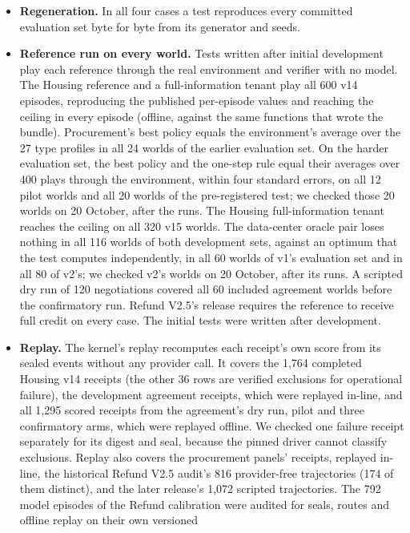 \begin{itemize}
\tightlist
\item
  \textbf{Regeneration.} In all four cases a test reproduces every committed evaluation set byte for byte from its
  generator and seeds.
\item
  \textbf{Reference run on every world.} Tests written after initial development play each reference through the real
  environment and verifier with no model. The Housing reference and a full-information tenant play all 600 v14
  episodes, reproducing the published per-episode values and reaching the ceiling in every episode (offline, against
  the same functions that wrote the bundle). Procurement's best policy equals the environment's average over the 27
  type profiles in all 24 worlds of the earlier evaluation set. On the harder evaluation set, the best policy and the
  one-step rule equal their averages over 400 plays through the environment, within four standard errors, on all 12
  pilot worlds and all 20 worlds of the pre-registered test; we checked those 20 worlds on 20 October, after the runs.
  The Housing full-information tenant reaches the ceiling on all 320 v15 worlds. The data-center oracle pair loses
  nothing in all 116 worlds of both development sets, against an optimum that the test computes independently, in
  all 60 worlds of v1's evaluation set and in all 80 of v2's; we checked v2's worlds on 20 October, after its runs. A
  scripted dry run of 120 negotiations covered all 60 included agreement worlds before the confirmatory run. Refund
  V2.5's release requires the reference to receive full credit on every case. The initial tests were written after
  development.
\item
  \textbf{Replay.} The kernel's replay recomputes each receipt's own score from its sealed events without any provider
  call. It covers the 1,764 completed Housing v14 receipts (the other 36 rows are verified exclusions for operational
  failure), the development agreement receipts, which were replayed in-line, and all 1,295 scored receipts from the
  agreement's dry run, pilot and three confirmatory arms, which were replayed offline. We checked one failure receipt
  separately for its digest and seal, because the pinned driver cannot classify exclusions. Replay also covers the
  procurement panels' receipts, replayed in-line, the historical Refund V2.5 audit's 816
  provider-free trajectories (174 of them distinct), and the later release's 1,072 scripted trajectories. The 792
  model episodes of the Refund calibration were audited for seals, routes and offline replay on their own versioned

\end{itemize}
